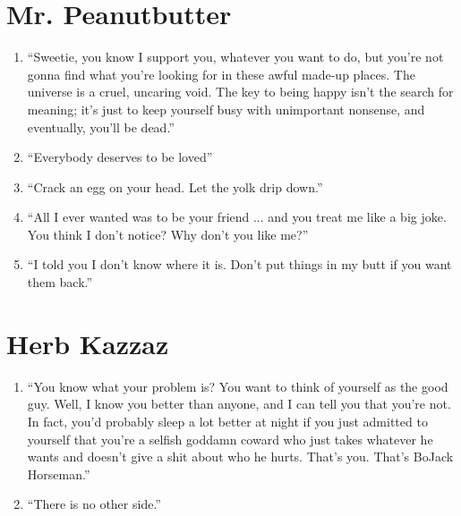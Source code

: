 \documentclass{book}
\numberwithin{equation}{section}
\begin{document}
\section{Mr. Peanutbutter}
\begin{enumerate}
    \item ``Sweetie, you know I support you, whatever you want to do, but you're not gonna find what you're looking for in these awful made-up places. The universe is a cruel, uncaring void. The key to being happy isn't the search for meaning; it's just to keep yourself busy with unimportant nonsense, and eventually, you'll be dead.''
    \item ``Everybody deserves to be loved''
    \item ``Crack an egg on your head. Let the yolk drip down.''
    \item ``All I ever wanted was to be your friend ... and you treat me like a big joke. You think I don't notice? Why don't you like me?''
    \item ``I told you I don't know where it is. Don't put things in my butt if you want them back.''
\end{enumerate}

\section{Herb Kazzaz}
\begin{enumerate}
    \item ``You know what your problem is? You want to think of yourself as the good guy. Well, I know you better than anyone, and I can tell you that you're not. In fact, you'd probably sleep a lot better at night if you just admitted to yourself that you're a selfish goddamn coward who just takes whatever he wants and doesn't give a shit about who he hurts. That's you. That's BoJack Horseman.''
    \item ``There is no other side.''
\end{enumerate}
\end{document}
